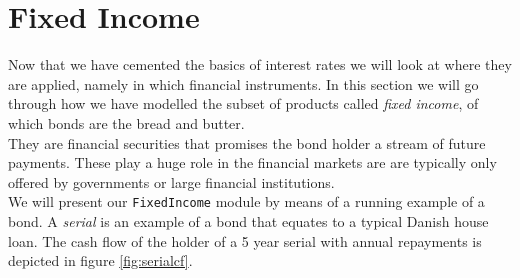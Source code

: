 
\section{Fixed Income}

Now that we have cemented the basics of interest rates we will look at 
where they are applied, namely in which financial instruments. In this section
we will go through how we have modelled the subset of products called 
\emph{fixed income}, of which bonds are the bread and butter.\\
They are financial securities that promises the bond holder a
stream of future payments. These play a huge role in the financial markets are
are typically only offered by governments or large financial institutions.\\

We will present our \texttt{FixedIncome} module by means of a running example
of a bond. 
A \emph{serial} is an example of a bond that equates to a typical Danish house
loan. The cash flow of the holder of a 5 year serial with annual repayments is
depicted in figure \ref{fig:serialcf}.\\

